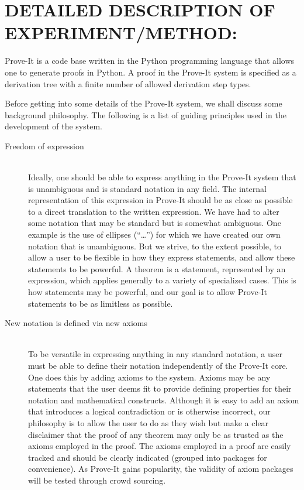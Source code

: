 \documentclass{article}[12pt]
\begin{document}
\section*{DETAILED DESCRIPTION OF EXPERIMENT/METHOD:}

Prove-It is a code base written in the Python programming language that allows one to generate proofs in Python.  A proof in the Prove-It system is specified as a derivation tree with a finite number of allowed derivation step types.

Before getting into some details of the Prove-It system, we shall discuss some background philosophy.  The following is a list of guiding principles used in the development of the system.

\begin{description}
\item[Freedom of expression] \hfill \\
  Ideally, one should be able to express anything in the Prove-It system that is unambiguous and is standard notation in any field.  The internal representation of this expression in Prove-It should be as close as possible to a direct translation to the written expression.  We have had to alter some notation that may be standard but is somewhat ambiguous.  One example is the use of ellipses (“…”) for which we have created our own notation that is unambiguous.  But we strive, to the extent possible, to allow a user to be flexible in how they express statements, and allow these statements to be powerful.  A theorem is a statement, represented by an expression, which applies generally to a variety of specialized cases.  This is how statements may be powerful, and our goal is to allow Prove-It statements to be as limitless as possible.
\item[New notation is defined via new axioms] \hfill \\
  To be versatile in expressing anything in any standard notation, a user must be able to define their notation independently of the Prove-It core.  One does this by adding axioms to the system.  Axioms may be any statements that the user deems fit to provide defining properties for their notation and mathematical constructs.  Although it is easy to add an axiom that introduces a logical contradiction or is otherwise incorrect, our philosophy is to allow the user to do as they wish but make a clear disclaimer that the proof of any theorem may only be as trusted as the axioms employed in the proof.  The axioms employed in a proof are easily tracked and should be clearly indicated (grouped into packages for convenience).  As Prove-It gains popularity, the validity of axiom packages will be tested through crowd sourcing.

\end{description}
\end{document}
